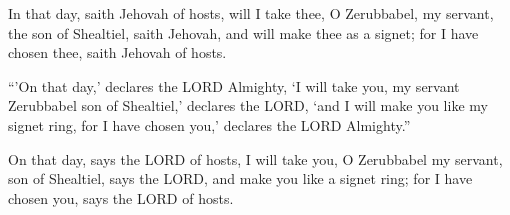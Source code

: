 			\begin{versebox}
					\item[BHS] 
					\item[LXX] 
					\item[ASV] In that day, saith Jehovah of hosts, will I take thee, O Zerubbabel, my servant, the son of Shealtiel, saith Jehovah, and will make thee as a signet; for I have chosen thee, saith Jehovah of hosts.
					\item[NIV] “’On that day,’ declares the LORD Almighty, ‘I will take you, my servant Zerubbabel son of Shealtiel,’ declares the LORD, ‘and I will make you like my signet ring, for I have chosen you,’ declares the LORD Almighty.”
					\item[NRSV] On that day, says the LORD of hosts, I will take you, O Zerubbabel my servant, son of Shealtiel, says the LORD, and make you like a signet ring; for I have chosen you, says the LORD of hosts.
			\end{versebox}
